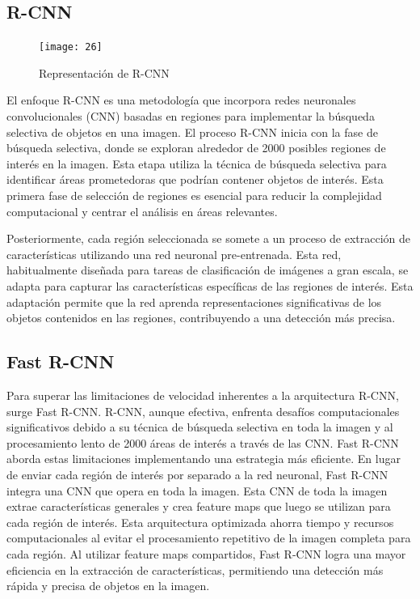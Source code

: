 	\subsection{R-CNN}
	
	\begin{figure} 
		\centering
		\texttt{[image: 26]}
		\caption{Representación de R-CNN}
	\end{figure}

	El enfoque R-CNN es una metodología que incorpora redes neuronales convolucionales (CNN) basadas en regiones para implementar la búsqueda selectiva de objetos en una imagen.
El proceso R-CNN inicia con la fase de búsqueda selectiva, donde se exploran alrededor de 2000 posibles regiones de interés en la imagen. Esta etapa utiliza la técnica de búsqueda selectiva para identificar áreas prometedoras que podrían contener objetos de interés. Esta primera fase de selección de regiones es esencial para reducir la complejidad computacional y centrar el análisis en áreas relevantes.

	Posteriormente, cada región seleccionada se somete a un proceso de extracción de características utilizando una red neuronal pre-entrenada. Esta red, habitualmente diseñada para tareas de clasificación de imágenes a gran escala, se adapta para capturar las características específicas de las regiones de interés. Esta adaptación permite que la red aprenda representaciones significativas de los objetos contenidos en las regiones, contribuyendo a una detección más precisa.

	\subsection{Fast R-CNN}
	Para superar las limitaciones de velocidad inherentes a la arquitectura R-CNN, surge Fast R-CNN. R-CNN, aunque efectiva, enfrenta desafíos computacionales significativos debido a su técnica de búsqueda selectiva en toda la imagen y al procesamiento lento de 2000 áreas de interés a través de las CNN.
Fast R-CNN aborda estas limitaciones implementando una estrategia más eficiente. En lugar de enviar cada región de interés por separado a la red neuronal, Fast R-CNN integra una CNN que opera en toda la imagen. Esta CNN de toda la imagen extrae características generales y crea feature maps que luego se utilizan para cada región de interés.
Esta arquitectura optimizada ahorra tiempo y recursos computacionales al evitar el procesamiento repetitivo de la imagen completa para cada región. Al utilizar feature maps compartidos, Fast R-CNN logra una mayor eficiencia en la extracción de características, permitiendo una detección más rápida y precisa de objetos en la imagen.

